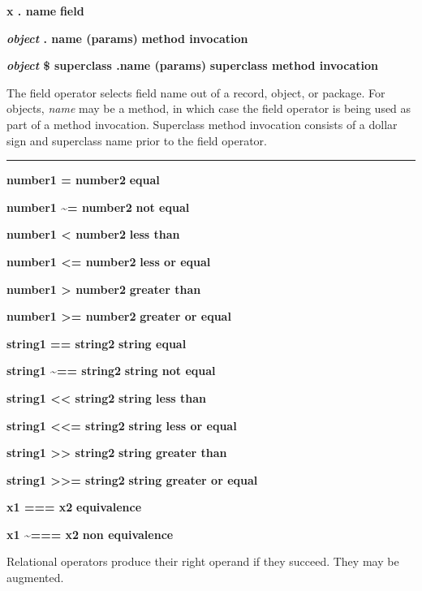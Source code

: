 \noindent
{\bf x . name } \hfill {\bf field}

\noindent
{\bf \textit{object} . name (params) } \hfill {\bf method invocation}

\noindent
{\bf \textit{object} \$ superclass .name (params) } \hfill {\bf superclass method invocation}

\noindent
The field operator selects field name out of a record,
object, or package. For objects, \textit{name} may be a method, in
which case the field operator is being used as part of a method
invocation. Superclass method invocation consists of a dollar sign and
superclass name prior to the field operator.

\bigskip\hrule\vspace{0.1cm}
\noindent
{\bf number1 = number2 } \hfill {\bf equal}

\noindent
{}
{\bf number1 \~{}= number2 } \hfill {\bf not equal}

\noindent
{\bf number1 {\textless} number2 } \hfill {\bf less than}

\noindent
{\bf number1 {\textless}= number2 } \hfill {\bf less or equal}

\noindent
{\bf number1 {\textgreater} number2 } \hfill {\bf greater than}

\noindent
{\bf number1 {\textgreater}= number2 } \hfill {\bf greater or equal}

\noindent
{\bf string1 == string2 } \hfill {\bf string equal}

\noindent
{\bf string1 \~{}== string2 } \hfill {\bf string not equal}

\noindent
{\bf string1 {\textless}{\textless} string2 } \hfill {\bf string less than}

\noindent
{\bf string1 {\textless}{\textless}= string2 } \hfill {\bf string less or equal}

\noindent
{\bf string1 {\textgreater}{\textgreater} string2 } \hfill {\bf string greater than}

\noindent
{\bf string1 {\textgreater}{\textgreater}= string2 } \hfill {\bf string greater or equal}

\noindent
{\bf x1 === x2 } \hfill {\bf equivalence}

\noindent
{\bf x1 \~{}=== x2 } \hfill {\bf non equivalence}

\noindent
Relational operators produce their right operand if they succeed. They
may be augmented.

